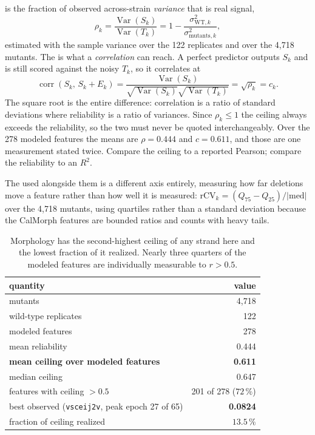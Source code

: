   is the fraction of observed across-strain \emph{variance}
that is real signal,
$$\rho_k = \frac{\operatorname{Var}(S_k)}{\operatorname{Var}(T_k)}
  = 1 - \frac{\sigma^2_{\mathrm{WT},k}}{\sigma^2_{\mathrm{mutants},k}},$$
estimated with the sample variance over the 122 replicates and over the 4,718 mutants. The
 is what a \emph{correlation} can reach. A perfect predictor outputs $S_k$ and
is still scored against the noisy $T_k$, so it correlates at
$$\operatorname{corr}(S_k,\, S_k + E_k)
  = \frac{\operatorname{Var}(S_k)}{\sqrt{\operatorname{Var}(S_k)}\sqrt{\operatorname{Var}(T_k)}}
  = \sqrt{\rho_k} = c_k.$$
The square root is the entire difference: correlation is a ratio of standard deviations
where reliability is a ratio of variances. Since $\rho_k \le 1$ the ceiling always exceeds
the reliability, so the two must never be quoted interchangeably. Over the 278 modeled
features the means are $\rho = 0.444$ and $c = 0.611$, and those are one measurement stated
twice. Compare the ceiling to a reported Pearson; compare the reliability to an $R^2$.

The  used alongside them is a different axis entirely, measuring how far
deletions move a feature rather than how well it is measured:
$\mathrm{rCV}_k = (Q_{75} - Q_{25}) / |\mathrm{med}|$ over the 4,718 mutants, using
quartiles rather than a standard deviation because the CalMorph features are bounded ratios
and counts with heavy tails.

\begin{table}[htbp]
\centering\small
\begin{tabular}{lr}
\toprule
quantity & value \\
\midrule
mutants & 4{,}718 \\
wild-type replicates & 122 \\
modeled features & 278 \\
mean reliability & 0.444 \\
\textbf{mean ceiling over modeled features} & \textbf{0.611} \\
median ceiling & 0.647 \\
features with ceiling $> 0.5$ & 201 of 278 ($72\,\%$) \\
\midrule
best observed (\texttt{vsceij2v}, peak epoch 27 of 65) & \textbf{0.0824} \\
fraction of ceiling realized & $\mathbf{13.5\,\%}$ \\
\bottomrule
\end{tabular}
\caption[]{Morphology has the second-highest ceiling of any strand here and the lowest
fraction of it realized. Nearly three quarters of the modeled features are individually
measurable to $r > 0.5$.}
\label{tab:morph-ceiling}
\end{table}

